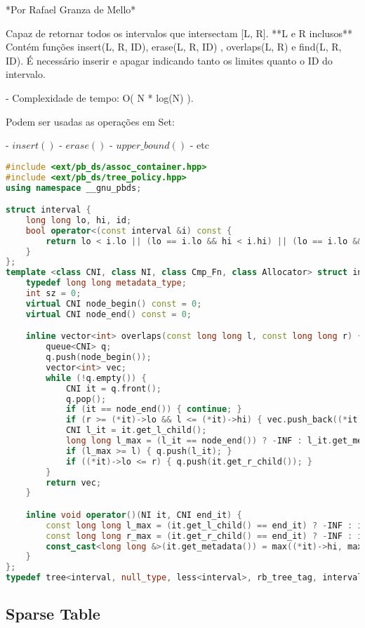 \documentclass[11pt, a4paper, twoside]{article}
\begin{document}
*Por Rafael Granza de Mello*


Capaz de retornar todos os intervalos que intersectam [L, R]. **L e R inclusos**  
Contém funções insert({L, R, ID}), erase({L, R, ID}) , overlaps(L, R) e find({L, R, ID}).  
É necessário inserir e apagar indicando tanto os limites quanto o ID do intervalo.

- Complexidade de tempo: O( N * log(N) ).

Podem ser usadas as operações em Set: 

- $insert()$
- $erase()$ 
- $upper\_bound()$
- etc 

\begin{lstlisting}[language=C++]
#include <ext/pb_ds/assoc_container.hpp>
#include <ext/pb_ds/tree_policy.hpp>
using namespace __gnu_pbds;

struct interval {
    long long lo, hi, id;
    bool operator<(const interval &i) const {
        return lo < i.lo || (lo == i.lo && hi < i.hi) || (lo == i.lo && hi == i.hi && id < i.id);
    }
};
template <class CNI, class NI, class Cmp_Fn, class Allocator> struct intervals_node_update {
    typedef long long metadata_type;
    int sz = 0;
    virtual CNI node_begin() const = 0;
    virtual CNI node_end() const = 0;

    inline vector<int> overlaps(const long long l, const long long r) {
        queue<CNI> q;
        q.push(node_begin());
        vector<int> vec;
        while (!q.empty()) {
            CNI it = q.front();
            q.pop();
            if (it == node_end()) { continue; }
            if (r >= (*it)->lo && l <= (*it)->hi) { vec.push_back((*it)->id); }
            CNI l_it = it.get_l_child();
            long long l_max = (l_it == node_end()) ? -INF : l_it.get_metadata();
            if (l_max >= l) { q.push(l_it); }
            if ((*it)->lo <= r) { q.push(it.get_r_child()); }
        }
        return vec;
    }

    inline void operator()(NI it, CNI end_it) {
        const long long l_max = (it.get_l_child() == end_it) ? -INF : it.get_l_child().get_metadata();
        const long long r_max = (it.get_r_child() == end_it) ? -INF : it.get_r_child().get_metadata();
        const_cast<long long &>(it.get_metadata()) = max((*it)->hi, max(l_max, r_max));
    }
};
typedef tree<interval, null_type, less<interval>, rb_tree_tag, intervals_node_update> interval_tree;
\end{lstlisting}

\subsection{Sparse Table}
\end{document}
